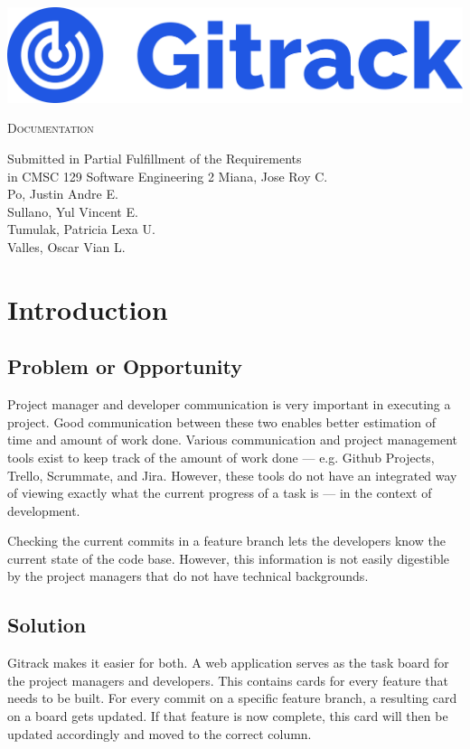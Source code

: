 \documentclass{article}
\begin{document}
\begin{titlepage}
	\centering \includegraphics[width=1\textwidth]{logo}\par\vspace{1cm}
						 {\scshape\LARGE Documentation \par} \vfill Submitted in Partial
						 Fulfillment of the Requirements\\ in CMSC 129 Software Engineering
						 2 \vfill Miana, Jose Roy C.\\Po, Justin Andre E.\\Sullano, Yul
						 Vincent E.\\Tumulak, Patricia Lexa U.\\Valles, Oscar Vian L.
\end{titlepage}
\newpage
\tableofcontents
\newpage
{}

\section{Introduction}
\subsection{Problem or Opportunity}
Project manager and developer communication is very important in executing a
project. Good communication between these two enables better estimation of time
and amount of work done. Various communication and project management tools
exist to keep track of the amount of work done --- e.g. Github Projects, Trello,
Scrummate, and Jira. However, these tools do not have an integrated way of
viewing exactly what the current progress of a task is — in the context of
development.

Checking the current commits in a feature branch lets the developers know the
current state of the code base. However, this information is not easily
digestible by the project managers that do not have technical backgrounds.
\subsection{Solution}
Gitrack makes it easier for both. A web application serves as the task board for
the project managers and developers. This contains cards for every feature that
needs to be built. For every commit on a specific feature branch, a resulting
card on a board gets updated. If that feature is now complete, this card will
then be updated accordingly and moved to the correct column.
\end{document}
